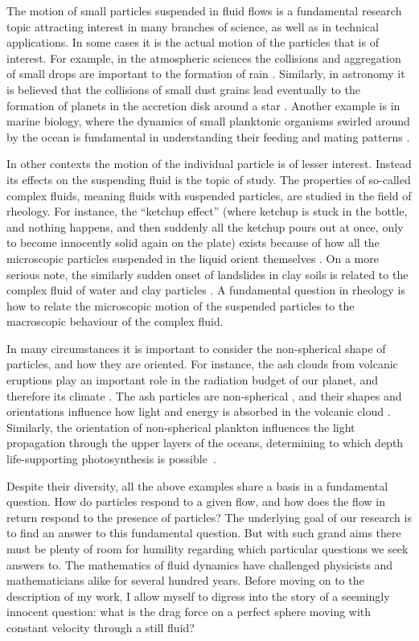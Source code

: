 \documentclass[thesis.tex]{subfiles}
\begin{document}
The motion of small particles suspended in fluid flows is a fundamental research topic attracting interest in many branches of science, as well as in technical applications. In some cases it is the actual motion of the particles that is of interest. For example, in the atmospheric sciences the collisions and aggregation of small drops are important to the formation of rain \cite{devenish2012}. Similarly, in astronomy it is believed that the collisions of small dust grains lead eventually to the formation of planets in the accretion disk around a star \cite{wilkinson2008}. Another example is in marine biology, where the dynamics of small planktonic organisms swirled around by the ocean is fundamental in understanding their feeding and mating patterns \cite{guasto2012}. 

In other contexts the motion of the individual particle is of lesser interest. Instead its effects on the suspending fluid is the topic of study. The properties of so-called complex fluids, meaning fluids with suspended particles, are studied in the field of rheology. For instance, the ``ketchup effect'' (where ketchup is stuck in the bottle, and nothing happens, and then suddenly all the ketchup pours out at once, only to become innocently solid again on the plate) exists because of how all the microscopic particles suspended in the liquid orient themselves \cite{bayod2008}. On a more serious note, the similarly sudden onset of landslides in clay soils is related to the complex fluid of water and clay particles \cite{coussot2002}. A fundamental question in rheology is how to relate the microscopic motion of the suspended particles to the macroscopic behaviour of the complex fluid.

In many circumstances it is important to consider the non-spherical shape of particles, and how they are oriented. For instance, the ash clouds from volcanic eruptions play an important role in the radiation budget of our planet, and therefore its climate \cite{mather2003}. The ash particles are non-spherical \cite{gasteiger2011}, and their shapes and orientations influence how light and energy is absorbed in the volcanic cloud \cite{dubovik2002}. Similarly, the orientation of non-spherical plankton influences the light propagation through the upper layers of the oceans, determining to which depth life-supporting photosynthesis is possible~\cite{marcos2011}. 

Despite their diversity, all the above examples share a basis in a fundamental question. How do particles respond to a given flow, and how does the flow in return respond to the presence of particles? The underlying goal of our research is to find an answer to this fundamental question. But with such grand aims there must be plenty of room for humility regarding which particular questions we seek answers to. The mathematics of fluid dynamics have challenged physicists and mathematicians alike for several hundred years. Before moving on to the description of my work, I allow myself to digress into the story of a seemingly innocent question: what is the drag force on a perfect sphere moving with constant velocity through a still fluid?
\end{document}
